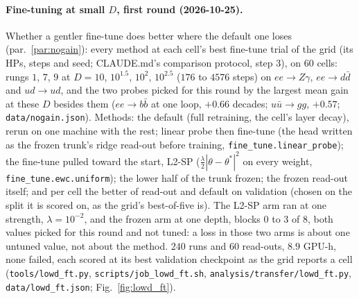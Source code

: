 \documentclass[11pt]{article}
\newcommand{\code}[1]{\texttt{#1}}
\begin{document}
\paragraph{Fine-tuning at small $D$, first round (2026-10-25).}\label{par:lowd_ft} Whether a gentler fine-tune
does better where the default one loses (par.~\ref{par:nogain}): every method at each cell's best fine-tune trial of the
grid (its HPs, steps and seed; CLAUDE.md's comparison protocol, step 3), on $60$ cells: rungs $1$, $7$, $9$ at
$D=10$, $10^{1.5}$, $10^2$, $10^{2.5}$ ($176$ to $4576$ steps) on $ee\to Z\gamma$, $ee\to d\bar d$ and $ud\to ud$, and
the two probes picked for this round by the largest mean gain at these $D$ besides them ($ee\to b\bar b$ at one loop, $+0.66$
decades; $u\bar u\to gg$, $+0.57$; \code{data/nogain.json}). Methods: the default (full retraining, the cell's layer
decay), rerun on one machine with the rest; linear probe then fine-tune (the head written as the frozen trunk's
ridge read-out before training, \code{fine\_tune.linear\_probe}); the fine-tune pulled toward the start, L2-SP
($\tfrac\lambda2|\theta-\theta^*|^2$ on every weight, \code{fine\_tune.ewc.uniform}); the lower half of the trunk frozen;
the frozen read-out itself; and per cell the better of read-out and default on validation (chosen on the split it is
scored on, as the grid's best-of-five is). The L2-SP arm ran at one strength, $\lambda=10^{-2}$, and the frozen arm at
one depth, blocks $0$ to $3$ of $8$, both values picked for this round and not tuned: a loss in those two arms is about one untuned
value, not about the method. $240$ runs and $60$ read-outs, $8.9$ GPU-h, none failed, each scored at its best validation checkpoint as the grid reports a cell (\code{tools/lowd\_ft.py},
\code{scripts/job\_lowd\_ft.sh}, \code{analysis/transfer/lowd\_ft.py}, \code{data/lowd\_ft.json};
Fig.~\ref{fig:lowd_ft}).
\end{document}

